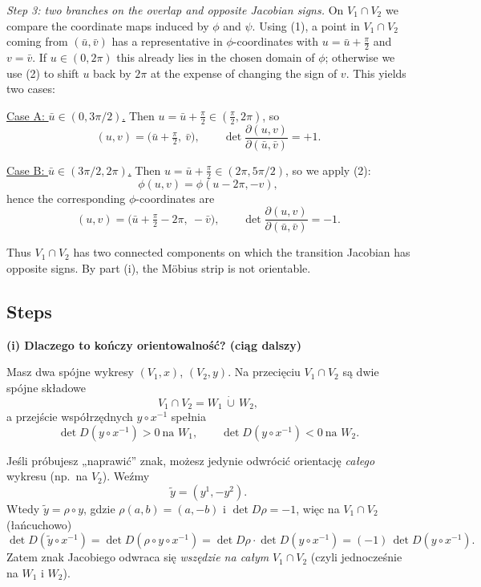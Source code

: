 \documentclass[12pt,a4paper]{article}
\theoremstyle{plain}
\theoremstyle{definition}      %
\begin{document}
\begin{enumerate}
	\medskip
	\noindent
	\emph{Step 3: two branches on the overlap and opposite Jacobian signs.}
	On $V_1\cap V_2$ we compare the coordinate maps induced by $\phi$ and $\psi$.
	Using (1), a point in $V_1\cap V_2$ coming from $(\bar u,\bar v)$ has a representative in $\phi$-coordinates
	with $u=\bar u+\frac{\pi}{2}$ and $v=\bar v$. If $u\in(0,2\pi)$ this already lies in the chosen domain of $\phi$;
	otherwise we use (2) to shift $u$ back by $2\pi$ at the expense of changing the sign of $v$.
	This yields two cases:
	
	\smallskip
	\noindent
	\underline{Case A: $\bar u\in(0,3\pi/2)$.}
	Then $u=\bar u+\frac{\pi}{2}\in(\frac{\pi}{2},2\pi)$, so
	\[
	(u,v)=\bigl(\bar u+\tfrac{\pi}{2},\ \bar v\bigr),
	\qquad
	\det\frac{\partial(u,v)}{\partial(\bar u,\bar v)}=+1.
	\]
	
	\smallskip
	\noindent
	\underline{Case B: $\bar u\in(3\pi/2,2\pi)$.}
	Then $u=\bar u+\frac{\pi}{2}\in(2\pi,5\pi/2)$, so we apply (2):
	\[
	\phi(u,v)=\phi(u-2\pi,-v),
	\]
	hence the corresponding $\phi$-coordinates are
	\[
	(u,v)=\bigl(\bar u+\tfrac{\pi}{2}-2\pi,\ -\bar v\bigr),
	\qquad
	\det\frac{\partial(u,v)}{\partial(\bar u,\bar v)}=-1.
	\]
	
	Thus $V_1\cap V_2$ has two connected components on which the transition Jacobian has opposite signs.
	By part (i), the M\"obius strip is not orientable.
\end{enumerate}


\subsection*{Steps}

\noindent\textbf{(i) Dlaczego to kończy orientowalność? (ciąg dalszy)}  

Masz dwa spójne wykresy $(V_1,x)$, $(V_2,y)$. Na przecięciu $V_1\cap V_2$ są dwie spójne składowe
\[
V_1\cap V_2 = W_1 \,\dot\cup\, W_2,
\]
a przejście współrzędnych $y\circ x^{-1}$ spełnia
\[
\det D(y\circ x^{-1})>0 \ \text{na } W_1,
\qquad
\det D(y\circ x^{-1})<0 \ \text{na } W_2.
\]

Jeśli próbujesz „naprawić” znak, możesz jedynie odwrócić orientację \emph{całego} wykresu (np.\ na $V_2$).
Weźmy
\[
\tilde y=(y^1,-y^2).
\]
Wtedy $\tilde y=\rho\circ y$, gdzie $\rho(a,b)=(a,-b)$ i $\det D\rho=-1$, więc na $V_1\cap V_2$ (łańcuchowo)
\[
\det D(\tilde y\circ x^{-1})
=
\det D(\rho\circ y\circ x^{-1})
=
\det D\rho\cdot \det D(y\circ x^{-1})
=
(-1)\,\det D(y\circ x^{-1}).
\]
Zatem znak Jacobiego odwraca się \emph{wszędzie na całym} $V_1\cap V_2$ (czyli jednocześnie na $W_1$ i $W_2$).
\end{document}
